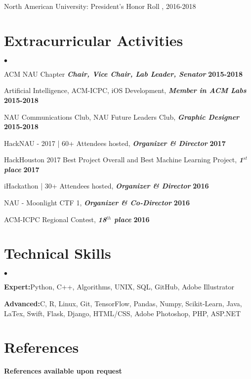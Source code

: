 \documentclass[margin,line]{res}
\newenvironment{list2}{
	\begin{list}{$\bullet$}{%
			\setlength{\itemsep}{0in}
			\setlength{\parsep}{0in} \setlength{\parskip}{0in}
			\setlength{\topsep}{0in} \setlength{\partopsep}{0in} 
			\setlength{\leftmargin}{0.2in}}}{\end{list}}
\begin{document}
\begin{resume}
		\vspace*{-2.5mm}
		North American University: President's Honor Roll , 2016-2018
		
		
		\section{\sc Extracurricular Activities}
		\begin{list2}
			\item ACM NAU Chapter {\em \textbf{Chair, Vice Chair, Lab Leader, Senator}} \hfill {\bf 2015-2018}
			\item Artificial Intelligence, ACM-ICPC, iOS Development, {\em \textbf{Member in ACM Labs}} \hfill {\bf 2015-2018}
			\item NAU Communications Club, NAU Future Leaders Club, {\em \textbf{Graphic Designer}} \hfill  {\bf 2015-2018}
			\item HackNAU - 2017 | 60+ Attendees hosted, {\em \textbf{Organizer \& Director}} \hfill {\bf 2017}
			\item HackHouston 2017 Best Project Overall and Best Machine Learning Project, {\em \textbf{1$^{st}$ place}} \hfill  {\bf 2017}
			\item iHackathon | 30+ Attendees hosted, {\em \textbf{Organizer \& Director}} \hfill {\bf 2016} 
			\item NAU - Moonlight CTF 1, {\em \textbf{Organizer \& Co-Director}} \hfill {\bf 2016}
			\item ACM-ICPC Regional Contest, {\em \textbf{18$^{th}$ place}} \hfill  {\bf 2016}
		\end{list2}
		
		\section{\sc Technical Skills} 
		\begin{list2}
			\item{\textbf{Expert:}\space Python, C++, Algorithms, UNIX, SQL, GitHub, Adobe Illustrator}
			\item{\textbf{Advanced:}\space C, R, Linux, Git, TensorFlow, Pandas, Numpy, Scikit-Learn, Java, LaTex, Swift, Flask, Django, HTML/CSS, Adobe Photoshop, PHP, ASP.NET}
		\end{list2}
		
		\section{\sc References} 
		{\bf References available upon request}
		
		
	\end{resume}
\end{document}
